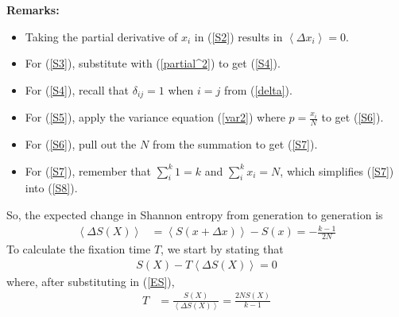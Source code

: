 \documentclass[12pt]{extarticle}
\newcommand{\<}{\langle}
\renewcommand{\>}{\rangle}
\theoremstyle{definition}
\begin{document}
\noindent \textbf{Remarks:}
\begin{itemize}
    \item Taking the partial derivative of $x_i$ in (\ref{S2}) results in $\left< \Delta x_i \right> = 0$.
    \item For (\ref{S3}), substitute with (\ref{partial^2}) to get (\ref{S4}).
    \item For (\ref{S4}), recall that $\delta_{ij} = 1$ when $i = j$ from (\ref{delta}).
    \item For (\ref{S5}), apply the variance equation (\ref{var2}) where $p = \frac{x_i}{N}$ to get (\ref{S6}).
    \item For (\ref{S6}), pull out the $N$ from the summation to get (\ref{S7}).
    \item For (\ref{S7}), remember that $\sum_i^k 1 = k$ and $\sum_i^k x_i = N$, which simplifies (\ref{S7}) into (\ref{S8}).
\end{itemize}

\noindent So, the expected change in Shannon entropy from generation to generation is
\begin{align}
    \left< \Delta S(X) \right> &= \left< S(x + \Delta x) \right> - S(x) = -\frac{k - 1}{2N} \label{ES}
\end{align}
To calculate the fixation time $T$, we start by stating that
\begin{align}
    S(X) - T \left< \Delta S(X) \right> = 0 \nonumber
\end{align}
where, after substituting in (\ref{ES}),
\begin{align}
    T &= \frac{S(X)}{\left< \Delta S(X) \right>} = \frac{2NS(X)}{k - 1} \nonumber
\end{align}
\end{document}
